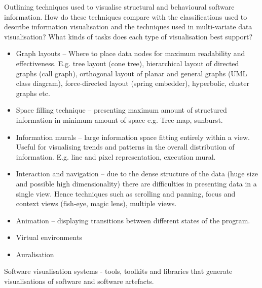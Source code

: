 
Outlining techniques used to visualise structural and behavioural software information. How do these techniques compare with the classifications used to describe information visualisation and the techniques used in multi-variate data visualisation? What kinds of tasks does each type of visualisation best support?

\begin{itemize}
	\item Graph layouts – Where to place data nodes for maximum readability and effectiveness. E.g. tree layout (cone tree), hierarchical layout of directed graphs (call graph), orthogonal layout of planar and general graphs (UML class diagram), force-directed layout (spring embedder), hyperbolic, cluster graphs etc.
	\item Space filling technique – presenting maximum amount of structured information in minimum amount of space e.g. Tree-map, sunburst.
	\item Information murals – large information space fitting entirely within a view. Useful for visualising trends and patterns in the overall distribution of information. E.g. line and pixel representation, execution mural.
	\item Interaction and navigation – due to the dense structure of the data (huge size and possible high dimensionality) there are difficulties in presenting data in a single view. Hence techniques such as scrolling and panning, focus and context views (fish-eye, magic lens), multiple views.
	\item Animation – displaying transitions between different states of the program.
	\item Virtual environments
	\item Auralisation
\end{itemize}

Software visualisation systems - tools, toolkits and libraries that generate visualisations of software and software artefacts.


